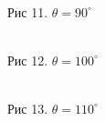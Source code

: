 \documentclass[12pt]{article}
\begin{document}
  \begin{figure}[h!]
    \begin{minipage}[h]{0.32\linewidth}
      \\
      Рис 11. $\theta = 90^{\circ}$
    \end{minipage}
    \begin{minipage}[h]{0.32\linewidth}
      \\
      Рис 12. $\theta = 100^{\circ}$
    \end{minipage}
    \begin{minipage}[h]{0.32\linewidth}
      \\
      Рис 13. $\theta = 110^{\circ}$
    \end{minipage}
  \end{figure}
\end{document}
